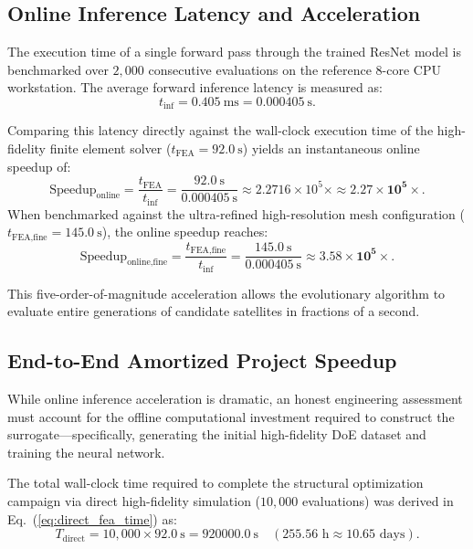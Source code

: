 \subsection{Online Inference Latency and Acceleration}

The execution time of a single forward pass through the trained ResNet model is benchmarked over $2{,}000$ consecutive evaluations on the reference 8-core CPU workstation. The average forward inference latency is measured as:
\begin{equation}
t_{\text{inf}} = \SI{0.405}{\milli\second} = \SI{0.000405}{\second}.
\label{eq:inference_latency}
\end{equation}

Comparing this latency directly against the wall-clock execution time of the high-fidelity finite element solver ($t_{\text{FEA}} = \SI{92.0}{\second}$) yields an instantaneous online speedup of:
\begin{equation}
\text{Speedup}_{\text{online}} = \frac{t_{\text{FEA}}}{t_{\text{inf}}} = \frac{\SI{92.0}{\second}}{\SI{0.000405}{\second}} \approx 2.2716 \times 10^5 \times \approx \mathbf{2.27 \times 10^5\times}.
\label{eq:online_speedup}
\end{equation}
When benchmarked against the ultra-refined high-resolution mesh configuration ($t_{\text{FEA,fine}} = \SI{145.0}{\second}$), the online speedup reaches:
\begin{equation}
\text{Speedup}_{\text{online,fine}} = \frac{t_{\text{FEA,fine}}}{t_{\text{inf}}} = \frac{\SI{145.0}{\second}}{\SI{0.000405}{\second}} \approx \mathbf{3.58 \times 10^5\times}.
\label{eq:online_speedup_fine}
\end{equation}

This five-order-of-magnitude acceleration allows the evolutionary algorithm to evaluate entire generations of candidate satellites in fractions of a second.

\subsection{End-to-End Amortized Project Speedup}

While online inference acceleration is dramatic, an honest engineering assessment must account for the offline computational investment required to construct the surrogate—specifically, generating the initial high-fidelity DoE dataset and training the neural network.

The total wall-clock time required to complete the structural optimization campaign via direct high-fidelity simulation ($10{,}000$ evaluations) was derived in Eq.~(\ref{eq:direct_fea_time}) as:
\begin{equation}
T_{\text{direct}} = 10{,}000 \times \SI{92.0}{\second} = \SI{920000.0}{\second} \quad (255.56\text{ h} \approx 10.65\text{ days}).
\end{equation}

